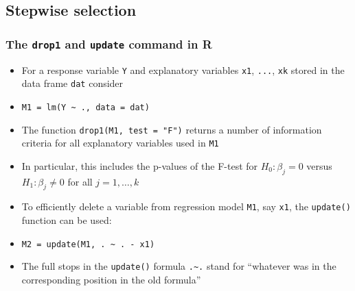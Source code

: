 \documentclass[a4paper]{article}
\begin{document}
\subsection{Stepwise selection}
\subsubsection{The \lstinline|drop1| and \lstinline|update| command in R}
\begin{itemize}
	\item For a response variable \lstinline|Y| and explanatory variables \lstinline|x1|, \lstinline|...|, \lstinline|xk| stored in the data frame \lstinline|dat| consider
	\item \lstinline|M1 = lm(Y ~ ., data = dat)|
	\item The function \lstinline|drop1(M1, test = "F")| returns a number of information criteria for all explanatory variables used in \lstinline|M1|
	\item In particular, this includes the p-values of the F-test for \( H_0: \beta_j = 0 \) versus \( H_1: \beta_j \neq 0 \) for all \( j = 1,\dotsc,k \) 
	\item To efficiently delete a variable from regression model \lstinline|M1|, say \lstinline|x1|, the \lstinline|update()| function can be used:
	\item \lstinline|M2 = update(M1, . ~ . - x1)|
	\item The full stops in the \lstinline|update()| formula \lstinline|.~.| stand for ``whatever was in the corresponding position in the old formula''
\end{itemize}
\end{document}
